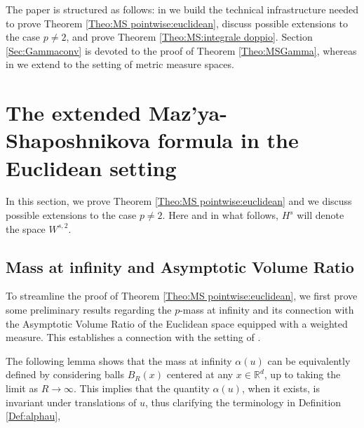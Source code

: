\documentclass[reqno,11pt]{amsart}
\numberwithin{equation}{section}
\theoremstyle{definition} %
\theoremstyle{plain}
\theoremstyle{definition}
\theoremstyle{remark}
\begin{document}
The paper is structured as follows: in  we build the technical infrastructure needed to prove Theorem \ref{Theo:MS pointwise:euclidean}, discuss possible extensions to the case $p\neq 2$, and prove Theorem \ref{Theo:MS:integrale doppio}. 
 Section \ref{Sec:Gammaconv} is devoted to the proof of Theorem \ref{Theo:MSGamma}, whereas in  we extend  to the setting of metric measure spaces. 



\section{The extended Maz'ya-Shaposhnikova formula in the Euclidean setting}\label{Sec:puntuale Rd}

In this section, we prove Theorem \ref{Theo:MS pointwise:euclidean} and we discuss possible extensions to the case $p\neq2$. Here and in what follows, $H^s$ will denote the space $W^{s,2}$.

\subsection{Mass at infinity and Asymptotic Volume Ratio}

To streamline the proof of Theorem \ref{Theo:MS pointwise:euclidean}, we first prove some preliminary results regarding the $p$-mass at infinity and its connection with the Asymptotic Volume Ratio of the Euclidean space equipped with a weighted measure. This establishes a connection with the setting of \cite{HanPinamontiXu2025}.

 The following lemma shows that the mass at infinity $\alpha(u)$ can be equivalently defined by considering balls $B_R(x)$ centered at any $x \in \mathbb{R}^d$, up to taking the limit as $R\to\infty$. This implies that the quantity $\alpha(u)$, when it exists, is invariant under translations of $u$, thus clarifying the terminology in Definition \ref{Def:alphau},
\end{document}
